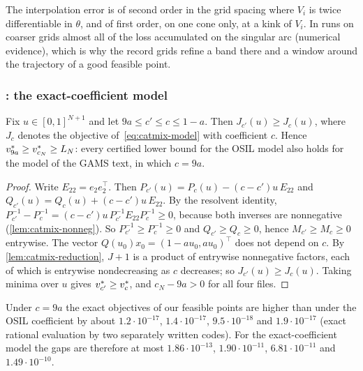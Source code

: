 The interpolation error is of second order in the grid spacing where $V_i$ is twice differentiable in $\theta$, and of first order, on one cone only, at a kink of $V_i$.
In runs on coarser grids almost all of the loss accumulated on the singular arc (numerical evidence), which is why the record grids refine a band there and a window around the trajectory of a good feasible point.

\subsubsection{\texorpdfstring{}{catmix}: the exact-coefficient model}\label{app:catmix-transport}

\begin{proposition}[transport to $c = 9a$]\label{prop:catmix-transport}
Fix $u \in [0,1]^{N+1}$ and let $9a \le c' \le c \le 1 - a$.
Then $J_{c'}(u) \ge J_c(u)$, where $J_c$ denotes the objective of~\eqref{eq:catmix-model} with coefficient $c$.
Hence $v^{*}_{9a} \ge v^{*}_{c_N} \ge L_N$: every certified lower bound for the OSIL model also holds for the model of the GAMS text, in which $c = 9a$.
\end{proposition}

\begin{proof}
Write $E_{22} = e_2 e_2^\top$.
Then $P_{c'}(u) = P_c(u) - (c - c')u\,E_{22}$ and $Q_{c'}(u) = Q_c(u) + (c - c')u\,E_{22}$.
By the resolvent identity, $P_{c'}^{-1} - P_c^{-1} = (c - c')u\,P_{c'}^{-1}E_{22}P_c^{-1} \ge 0$, because both inverses are nonnegative (\cref{lem:catmix-nonneg}).
So $P_{c'}^{-1} \ge P_c^{-1} \ge 0$ and $Q_{c'} \ge Q_c \ge 0$, hence $M_{c'} \ge M_c \ge 0$ entrywise.
The vector $Q(u_0)x_0 = (1 - au_0, au_0)^\top$ does not depend on $c$.
By \cref{lem:catmix-reduction}, $J + 1$ is a product of entrywise nonnegative factors, each of which is entrywise nondecreasing as $c$ decreases; so $J_{c'}(u) \ge J_c(u)$.
Taking minima over $u$ gives $v^{*}_{c'} \ge v^{*}_c$, and $c_N - 9a > 0$ for all four files.
\end{proof}

Under $c = 9a$ the exact objectives of our feasible points are higher than under the OSIL coefficient by about $1.2\cdot10^{-17}$, $1.4\cdot10^{-17}$, $9.5\cdot10^{-18}$ and $1.9\cdot10^{-17}$ (exact rational evaluation by two separately written codes).
For the exact-coefficient model the gaps are therefore at most $1.86\cdot10^{-13}$, $1.90\cdot10^{-11}$, $6.81\cdot10^{-11}$ and $1.49\cdot10^{-10}$.

